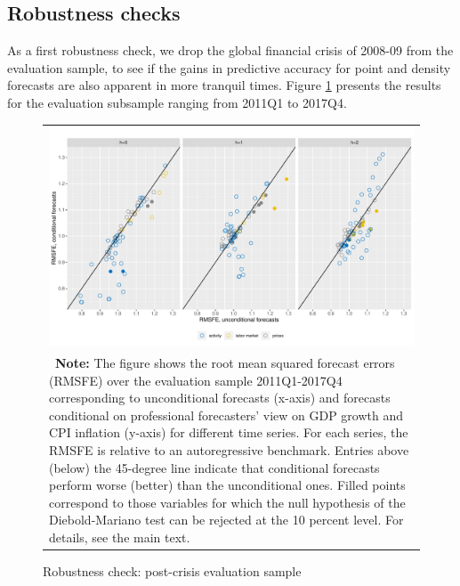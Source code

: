\documentclass[notitlepage,a4paper,12pt]{article}
\begin{document}
\subsection{Robustness checks}

As a first robustness check, we drop the global financial crisis of 2008-09 from the evaluation sample, to see if the gains in predictive accuracy for point and density forecasts are also apparent in more tranquil times. Figure \ref{fig:postcrisis} presents the results for the evaluation subsample ranging from 2011Q1 to 2017Q4.  

\begin{figure}[htbp] \centering
    \caption{Robustness check: post-crisis evaluation sample \label{fig:postcrisis}}
    \footnotesize
    \begin{tabular}{p{16cm}}
        \multicolumn{1}{c}{\includegraphics*[scale = 0.6]{../figures/fig_eval_postcrisis.pdf}} \\
        {
        \footnotesize \textbf{Note:} The figure shows the root mean squared forecast errors (RMSFE) over the evaluation sample 2011Q1-2017Q4 corresponding to unconditional forecasts (x-axis) and forecasts conditional on professional forecasters' view on GDP growth and CPI inflation (y-axis) for different time series. For each series, the RMSFE is relative to an autoregressive benchmark. Entries above (below) the 45-degree line indicate that conditional forecasts perform worse (better) than the unconditional ones. Filled points correspond to those variables for which the null hypothesis of the Diebold-Mariano test can be rejected at the 10 percent level. For details, see the main text. 
        }
        \end{tabular}
    \newline
    \normalsize
\end{figure}
\end{document}

